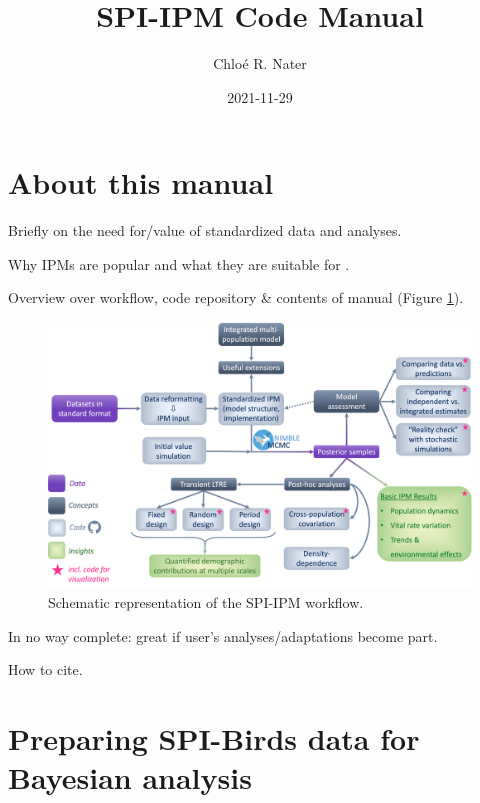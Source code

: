 \documentclass[
]{book}
\title{SPI-IPM Code Manual}
\author{Chloé R. Nater}
\date{2021-11-29}
\begin{document}
\maketitle

{
\setcounter{tocdepth}{1}
\tableofcontents
}
\hypertarget{about-this-manual}{%
\chapter*{About this manual}\label{about-this-manual}}

Briefly on the need for/value of standardized data and analyses.

Why IPMs are popular and what they are suitable for \citep{kery2011, plard2019}.

Overview over workflow, code repository \& contents of manual (Figure \ref{fig:WorkflowDiag}).

\begin{figure}

{\centering \includegraphics[width=1\linewidth]{Figures/SPI-IPM_Workflow} 

}

\caption{Schematic representation of the SPI-IPM workflow.}\label{fig:WorkflowDiag}
\end{figure}

In no way complete: great if user's analyses/adaptations become part.

How to cite.

\hypertarget{DataPrep}{%
\chapter{Preparing SPI-Birds data for Bayesian analysis}\label{DataPrep}}
\end{document}
